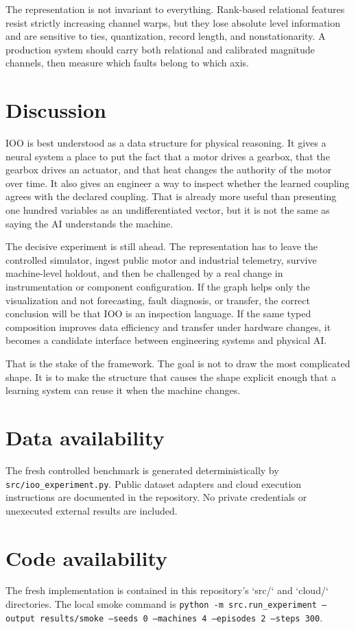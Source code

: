 \documentclass[11pt]{article}
\begin{document}
The representation is not invariant to everything. Rank-based relational features resist strictly increasing channel warps, but they lose absolute level information and are sensitive to ties, quantization, record length, and nonstationarity. A production system should carry both relational and calibrated magnitude channels, then measure which faults belong to which axis.

\section{Discussion}

IOO is best understood as a data structure for physical reasoning. It gives a neural system a place to put the fact that a motor drives a gearbox, that the gearbox drives an actuator, and that heat changes the authority of the motor over time. It also gives an engineer a way to inspect whether the learned coupling agrees with the declared coupling. That is already more useful than presenting one hundred variables as an undifferentiated vector, but it is not the same as saying the AI understands the machine.

The decisive experiment is still ahead. The representation has to leave the controlled simulator, ingest public motor and industrial telemetry, survive machine-level holdout, and then be challenged by a real change in instrumentation or component configuration. If the graph helps only the visualization and not forecasting, fault diagnosis, or transfer, the correct conclusion will be that IOO is an inspection language. If the same typed composition improves data efficiency and transfer under hardware changes, it becomes a candidate interface between engineering systems and physical AI.

That is the stake of the framework. The goal is not to draw the most complicated shape. It is to make the structure that causes the shape explicit enough that a learning system can reuse it when the machine changes.

\section*{Data availability}
The fresh controlled benchmark is generated deterministically by \texttt{src/ioo\_experiment.py}. Public dataset adapters and cloud execution instructions are documented in the repository. No private credentials or unexecuted external results are included.

\section*{Code availability}
The fresh implementation is contained in this repository's `src/` and `cloud/` directories. The local smoke command is \texttt{python -m src.run\_experiment --output results/smoke --seeds 0 --machines 4 --episodes 2 --steps 300}.
\end{document}
